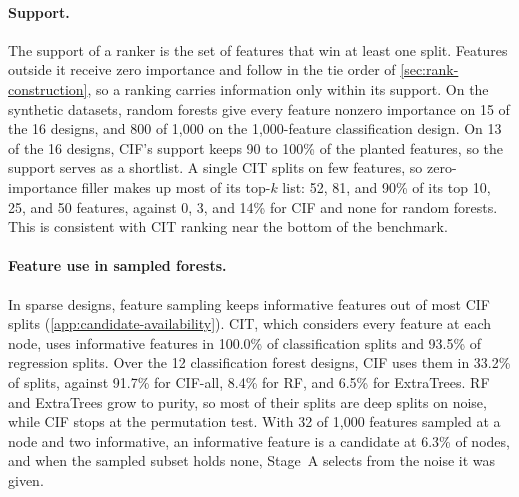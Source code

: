 \paragraph{Support.}
The support of a ranker is the set of features that win at least one split.
Features outside it receive zero importance and follow in the tie order of
\cref{sec:rank-construction}, so a ranking carries information only within its
support. On the synthetic datasets, random forests give every feature nonzero
importance on 15 of the 16 designs, and 800 of 1,000 on the 1,000-feature
classification design. On 13 of the 16 designs, CIF's support keeps 90 to
100\% of the planted features, so the support serves as a shortlist. A single
CIT splits on few features, so zero-importance filler makes up most of its
top-$k$ list: 52, 81, and 90\% of its top 10, 25, and 50 features, against 0,
3, and 14\% for CIF and none for random forests. This is consistent with CIT
ranking near the bottom of the benchmark.

\paragraph{Feature use in sampled forests.}
In sparse designs, feature sampling keeps informative features out of most CIF
splits (\cref{app:candidate-availability}). CIT, which considers every feature
at each node, uses informative features in 100.0\% of classification splits
and 93.5\% of regression splits. Over the 12 classification forest designs,
CIF uses them in 33.2\% of splits, against 91.7\% for CIF-all, 8.4\% for RF,
and 6.5\% for ExtraTrees. RF and ExtraTrees grow to purity, so most of their
splits are deep splits on noise, while CIF stops at the permutation test. With
32 of 1,000 features sampled at a node and two informative, an informative
feature is a candidate at 6.3\% of nodes, and when the sampled subset holds
none, Stage~A selects from the noise it was given.

